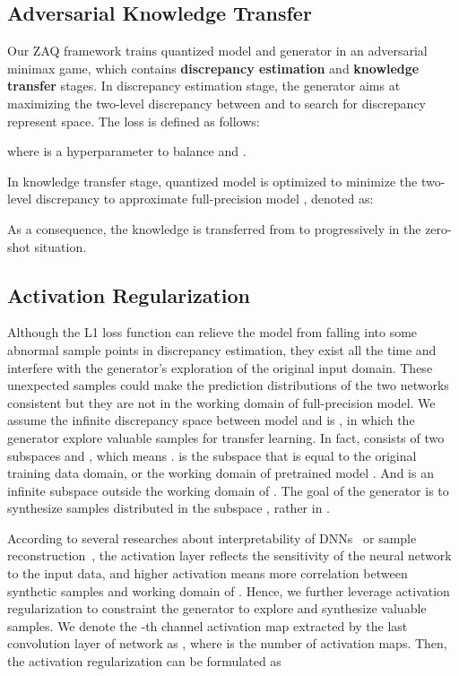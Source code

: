 \documentclass[final]{cvpr}
\begin{document}
\subsection{Adversarial Knowledge Transfer}

Our ZAQ framework trains quantized model  and generator  in an adversarial minimax game, which contains \textbf{discrepancy estimation} and \textbf{knowledge transfer} stages.
In discrepancy estimation stage, the generator  aims at maximizing the two-level discrepancy between  and  to search for discrepancy represent space. The loss is defined as follows:

where  is a hyperparameter to balance  and .

In knowledge transfer stage, quantized model  is optimized to minimize the two-level discrepancy to approximate full-precision model , denoted as: 

As a consequence, the knowledge is transferred from  to  progressively in the zero-shot situation. 


\subsection{Activation Regularization}

Although the L1 loss function can relieve the model from falling into some abnormal sample points in discrepancy estimation, they exist all the time and interfere with the generator's exploration of the original input domain. These unexpected samples could make the prediction distributions of the two networks consistent but they are not in the working domain of full-precision model. 
We assume the infinite discrepancy space between model  and  is , in which the generator  explore valuable samples for transfer learning. In fact,  consists of two subspaces  and , which means .  is the subspace that is equal to the original training data domain, or the working domain of pretrained model . And  is an infinite subspace outside the working domain of . 
The goal of the generator is to synthesize samples distributed in the subspace , rather in . 

According to several researches about interpretability of DNNs~\cite{zeiler2014visualizing,dong2017towards} or sample reconstruction~\cite{lopes2017data,chen2019data}, the activation layer reflects the sensitivity of the neural network to the input data, and higher activation means more correlation between synthetic samples and working domain of . 
Hence, we further leverage activation regularization to constraint the generator to explore and synthesize valuable samples. We denote the -th channel activation map extracted by the last convolution layer of network  as , where  is the number of activation maps. Then, the activation regularization can be formulated as 
\end{document}
